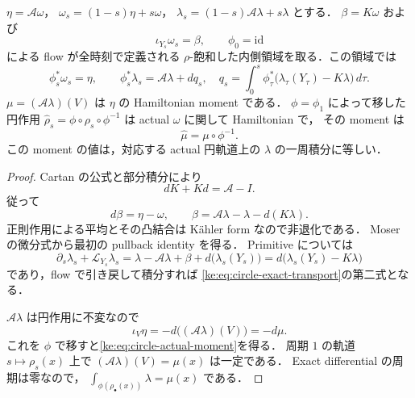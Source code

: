 \begin{lemma}
\label{ke:circle-exact-transport}
$\eta=\mathcal A\omega$，
$\omega_s=(1-s)\eta+s\omega$，
$\lambda_s=(1-s)\mathcal A\lambda+s\lambda$ とする．
$\beta=K\omega$ および
\[
 \iota_{Y_s}\omega_s=\beta,\qquad \phi_0=\mathrm{id}
\]
による flow が全時刻で定義される $\rho$-飽和した内側領域を取る．この領域では
\begin{equation}\label{ke:eq:circle-exact-transport}
 \phi_s^*\omega_s=\eta,\qquad
 \phi_s^*\lambda_s=\mathcal A\lambda+dq_s,
 \quad
 q_s=\int_0^s\phi_\tau^*
       \bigl(\lambda_\tau(Y_\tau)-K\lambda\bigr)\,d\tau .
\end{equation}
$\mu=(\mathcal A\lambda)(V)$ は $\eta$ の Hamiltonian moment である．
$\phi=\phi_1$ によって移した円作用
$\widehat\rho_s=\phi\circ\rho_s\circ\phi^{-1}$ は actual $\omega$ に関して Hamiltonian で，
その moment は
\begin{equation}\label{ke:eq:circle-actual-moment}
 \widehat\mu=\mu\circ\phi^{-1}.
\end{equation}
この moment の値は，対応する actual 円軌道上の $\lambda$ の一周積分に等しい．
\end{lemma}
\begin{proof}
Cartan の公式と部分積分により
\[
 dK+Kd=\mathcal A-I.
\]
従って
\[
 d\beta=\eta-\omega,\qquad
 \beta=\mathcal A\lambda-\lambda-d(K\lambda).
\]
正則作用による平均とその凸結合は K\"ahler form なので非退化である．
Moser の微分式から最初の pullback identity を得る．
Primitive については
\[
 \partial_s\lambda_s+\mathcal L_{Y_s}\lambda_s
 =\lambda-\mathcal A\lambda+\beta
     +d\bigl(\lambda_s(Y_s)\bigr)
 =d\bigl(\lambda_s(Y_s)-K\lambda\bigr)
\]
であり，flow で引き戻して積分すれば
\eqref{ke:eq:circle-exact-transport}の第二式となる．

$\mathcal A\lambda$ は円作用に不変なので
\[
 \iota_V\eta=-d\bigl((\mathcal A\lambda)(V)\bigr)=-d\mu.
\]
これを $\phi$ で移すと\eqref{ke:eq:circle-actual-moment}を得る．
周期 $1$ の軌道 $s\mapsto\rho_s(x)$ 上で
$(\mathcal A\lambda)(V)=\mu(x)$ は一定である．
Exact differential の周期は零なので，
$\int_{\phi(\rho_\bullet(x))}\lambda=\mu(x)$ である．
\end{proof}

